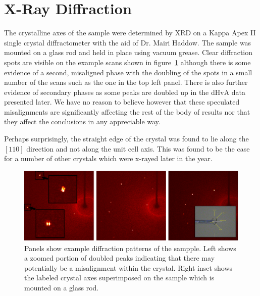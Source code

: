
\section{X-Ray Diffraction}
    \label{Sec:ResD:XrayDiffraction}

The crystalline axes of the sample were determined by \ac{XRD} on a Kappa Apex II single crystal diffractometer with the aid of Dr. Mairi Haddow. The sample was mounted on a glass rod and held in place using vacuum grease. Clear diffraction spots are visible on the example scans shown in figure~\ref{Fig:ResD:XRayDiffraction} although there is some evidence of a second, misaligned phase with the doubling of the spots in a small number of the scans such as the one in the top left panel. There is also further evidence of secondary phases as some peaks are doubled up in the dHvA data presented later. We have no reason to believe however that these speculated misalignments are significantly affecting the rest of the body of results nor that they affect the conclusions in any appreciable way.

Perhaps surprisingly, the straight edge of the crystal was found to lie along the $[110]$ direction and not along the unit cell axis. This was found to be the case for a number of other \BaFePAs crystals which were x-rayed later in the year.

\begin{figure}[htbp]
    \begin{center}
        \includegraphics[scale=0.7]{Chapter-dHvABaFe2P2/Figures/Xrays/XRayDiffraction/XRayDiffraction}
        \caption{Panels show example diffraction patterns of the \BaFeP sampple. Left shows a zoomed portion of doubled peaks indicating that there may potentially be a misalignment within the crystal. Right inset shows the labeled crystal axes superimposed on the sample which is mounted on a glass rod.}
        \label{Fig:ResD:XRayDiffraction}
    \end{center}
\end{figure}

